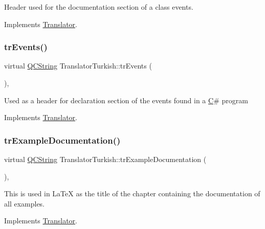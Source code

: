Header used for the documentation section of a class\textquotesingle{} events. 

Implements \mbox{\hyperlink{class_translator}{Translator}}.

\mbox{\label{class_translator_turkish_a5399380a9e87985c2c3afed2e2ba26a6}} 
\subsubsection{\texorpdfstring{trEvents()}{trEvents()}}
{\footnotesize\ttfamily virtual \mbox{\hyperlink{class_q_c_string}{Q\+C\+String}} Translator\+Turkish\+::tr\+Events (\begin{DoxyParamCaption}{ }\end{DoxyParamCaption})\hspace{0.3cm}{\ttfamily [inline]}, {\ttfamily [virtual]}}

Used as a header for declaration section of the events found in a \mbox{\hyperlink{class_c}{C}}\# program 

Implements \mbox{\hyperlink{class_translator}{Translator}}.

\mbox{\label{class_translator_turkish_a994979419ca742b65e99689cd331f2c7}} 
\subsubsection{\texorpdfstring{trExampleDocumentation()}{trExampleDocumentation()}}
{\footnotesize\ttfamily virtual \mbox{\hyperlink{class_q_c_string}{Q\+C\+String}} Translator\+Turkish\+::tr\+Example\+Documentation (\begin{DoxyParamCaption}{ }\end{DoxyParamCaption})\hspace{0.3cm}{\ttfamily [inline]}, {\ttfamily [virtual]}}

This is used in La\+TeX as the title of the chapter containing the documentation of all examples. 

Implements \mbox{\hyperlink{class_translator}{Translator}}.

\mbox{\label{class_translator_turkish_a70f4c6369b09048ae6adedd0cdc6d165}} 
